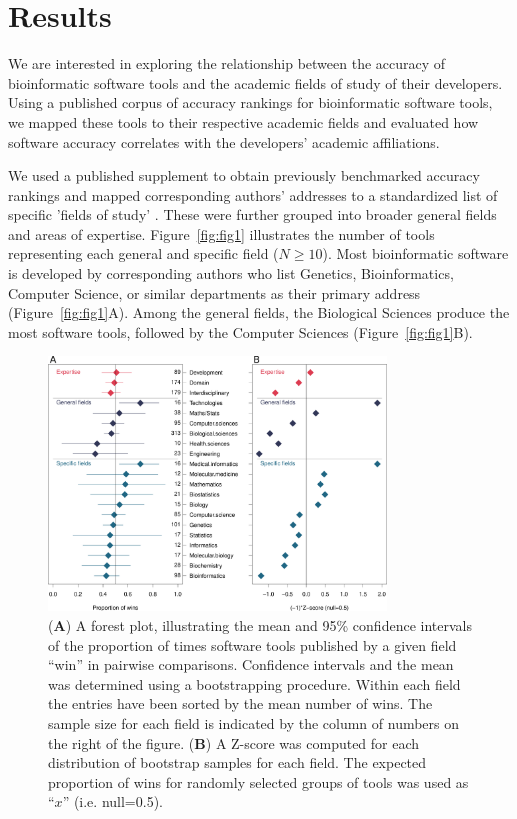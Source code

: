 \documentclass[fleqn,10pt,doc,onecolumn]{SelfArx}%
\begin{document}
\section*{Results}

We are interested in exploring the relationship between the accuracy
of bioinformatic software tools and the academic fields of study of
their developers. Using a published corpus of accuracy rankings
for bioinformatic software tools, we mapped these tools to their
respective academic fields and evaluated how software accuracy
correlates with the developers' academic affiliations.


We used a published supplement \cite{gardner2024} to obtain previously
benchmarked accuracy rankings and mapped corresponding authors'
addresses to a standardized list of specific 'fields of study'
\cite{fields2014}. These were further grouped into broader general
fields and areas of expertise. Figure~\ref{fig:fig1} illustrates the
number of tools representing each general and specific field ($N\ge 10$). Most
bioinformatic software is developed by corresponding authors who list
Genetics, Bioinformatics, Computer Science, or similar departments as
their primary address (Figure~\ref{fig:fig1}A). Among the general
fields, the Biological Sciences produce the most software tools,
followed by the Computer Sciences (Figure~\ref{fig:fig1}B).

\begin{figure}[ht!]
\begin{center}
  \includegraphics[width=0.8\textwidth]{forest-z-Plot.pdf}
\end{center}
\caption{(\textbf{A}) A forest plot, illustrating the mean and 95\%
  confidence intervals of the proportion of times software tools
  published by a given field ``win'' in pairwise
  comparisons. Confidence intervals and the mean was determined using
  a bootstrapping procedure. Within each field the entries have been
  sorted by the mean number of wins. The sample size for each field is
  indicated by the column of numbers on the right of the figure.
  (\textbf{B}) A Z-score was computed for each distribution of
  bootstrap samples for each field. The expected proportion of wins
  for randomly selected groups of tools was used as ``$x$''
  (i.e. null=0.5).}
\label{fig:fig2}
\end{figure}
\end{document}
